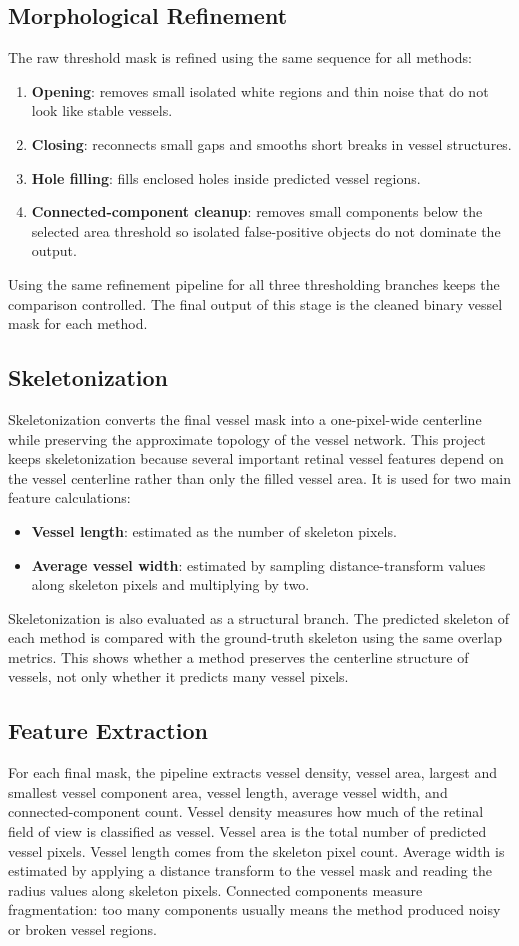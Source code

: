 \documentclass[12pt,a4paper]{article}
\begin{document}
\subsection{Morphological Refinement}
The raw threshold mask is refined using the same sequence for all methods:
\begin{enumerate}
    \item \textbf{Opening}: removes small isolated white regions and thin noise that do not look like stable vessels.
    \item \textbf{Closing}: reconnects small gaps and smooths short breaks in vessel structures.
    \item \textbf{Hole filling}: fills enclosed holes inside predicted vessel regions.
    \item \textbf{Connected-component cleanup}: removes small components below the selected area threshold so isolated false-positive objects do not dominate the output.
\end{enumerate}
Using the same refinement pipeline for all three thresholding branches keeps the comparison controlled. The final output of this stage is the cleaned binary vessel mask for each method.

\subsection{Skeletonization}
Skeletonization converts the final vessel mask into a one-pixel-wide centerline while preserving the approximate topology of the vessel network. This project keeps skeletonization because several important retinal vessel features depend on the vessel centerline rather than only the filled vessel area. It is used for two main feature calculations:
\begin{itemize}
    \item \textbf{Vessel length}: estimated as the number of skeleton pixels.
    \item \textbf{Average vessel width}: estimated by sampling distance-transform values along skeleton pixels and multiplying by two.
\end{itemize}
Skeletonization is also evaluated as a structural branch. The predicted skeleton of each method is compared with the ground-truth skeleton using the same overlap metrics. This shows whether a method preserves the centerline structure of vessels, not only whether it predicts many vessel pixels.

\subsection{Feature Extraction}
For each final mask, the pipeline extracts vessel density, vessel area, largest and smallest vessel component area, vessel length, average vessel width, and connected-component count. Vessel density measures how much of the retinal field of view is classified as vessel. Vessel area is the total number of predicted vessel pixels. Vessel length comes from the skeleton pixel count. Average width is estimated by applying a distance transform to the vessel mask and reading the radius values along skeleton pixels. Connected components measure fragmentation: too many components usually means the method produced noisy or broken vessel regions.
\end{document}
